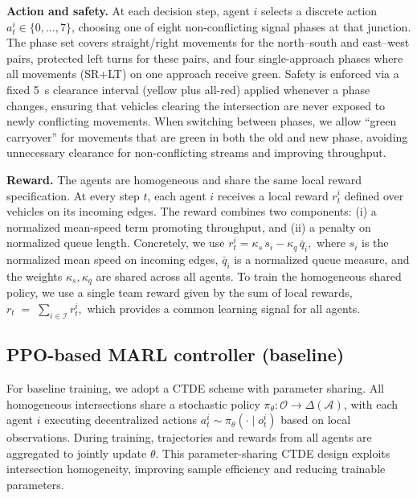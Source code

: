 \documentclass{ifacconf}
\newcommand{\1}{\mbox{1}\hspace{-0.25em}\mbox{l}}
\begin{document}
\textbf{Action and safety.}
At each decision step, agent $i$ selects a discrete action $a_t^i \in \{0,\dots,7\}$, choosing one of eight non-conflicting signal phases at that junction. The phase set covers straight/right movements for the north--south and east--west pairs, protected left turns for these pairs, and four single-approach phases where all movements (SR+LT) on one approach receive green. Safety is enforced via a fixed \SI{5}{s} clearance interval (yellow plus all-red) applied whenever a phase changes, ensuring that vehicles clearing the intersection are never exposed to newly conflicting movements. When switching between phases, we allow ``green carryover'' for movements that are green in both the old and new phase, avoiding unnecessary clearance for non-conflicting streams and improving throughput.

\textbf{Reward.}
The agents are homogeneous and share the same local reward specification. 
At every step $t$, each agent $i$ receives a local reward $r_t^i$ defined over vehicles on its incoming edges. 
The reward combines two components: (i) a normalized mean-speed term promoting throughput, and (ii) a penalty on normalized queue length. 
Concretely, we use
$r_t^i
= \kappa_s \, s_i
- \kappa_q \, \bar q_i,$
where $s_i$ is the normalized mean speed on incoming edges, $\bar q_i$ is a normalized queue measure, and the weights $\kappa_s,\kappa_q$ are shared across all agents.
To train the homogeneous shared policy, we use a single team reward given by the sum of local rewards,
$r_t \;=\; \sum_{i\in\mathcal{I}} r_t^i,$
which provides a common learning signal for all agents.








\subsection{PPO-based MARL controller (baseline)}
\label{subsec:ppo-baseline}

For baseline training, we adopt a CTDE scheme with parameter sharing.
All homogeneous intersections share a stochastic policy $\pi_\theta : \mathcal{O} \to \Delta(\mathcal{A})$,
with each agent $i$ executing decentralized actions $a_t^i \sim \pi_\theta(\cdot \mid o_t^i)$ based on local observations.
During training, trajectories and rewards from all agents are aggregated to jointly update $\theta$.
This parameter-sharing CTDE design exploits intersection homogeneity, improving sample efficiency and reducing trainable parameters.
\end{document}
